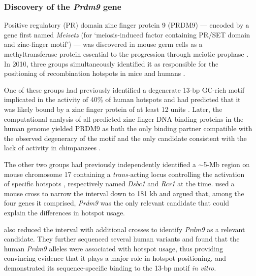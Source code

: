 \subsubsection{Discovery of the \textit{Prdm9} gene}

Positive regulatory (PR) domain zinc finger protein 9 (PRDM9) — encoded by a gene first named \textit{Meisetz} (for ‘meiosis-induced factor containing PR/SET domain and zinc-finger motif’) — was discovered in mouse germ cells as a methyltransferase protein essential to the progression through meiotic prophase \citep{hayashi2005histone,hayashi2006meisetz}.
In 2010, three groups simultaneously identified it as responsible for the positioning of recombination hotspots in mice and humans \citep[reviewed in \citealp{cheung2010genetic} and \citealp{hochwagen2010meiosis}]{baudat2010prdm9,myers2010drive,parvanov2010prdm9}.

One of these groups had previously identified a degenerate 13-bp GC-rich motif \citep{myers2005finescale} implicated in the activity of 40\% of human hotspots \citep{myers2008common,webb2008sperm} and had predicted that it was likely bound by a zinc finger protein of at least 12 units \citep{myers2008common}.
Later, the computational analysis of all predicted zinc-finger DNA-binding proteins in the human genome yielded PRDM9 as both the only binding partner compatible with the observed degeneracy of the motif and the only candidate consistent with the lack of activity in chimpanzees \citep{myers2010drive}.

The other two groups had previously independently identified a $\sim$5-Mb region on mouse chromosome 17 containing a \textit{trans-}acting locus controlling the activation of specific hotspots \citep{grey2009genomewide,parvanov2009transregulation}, respectively named \textit{Dsbc1} and \textit{Rcr1} at the time.
\citet{parvanov2010prdm9} used a mouse cross to narrow the interval down to 181 kb and argued that, among the four genes it comprised, \textit{Prdm9} was the only relevant candidate that could explain the differences in hotspot usage.

\citet{baudat2010prdm9} also reduced the interval with additional crosses to identify \textit{Prdm9} as a relevant candidate. 
They further sequenced several human variants and found that the human \textit{Prdm9} alleles were associated with hotspot usage, thus providing convincing evidence that it plays a major role in hotspot positioning, and demonstrated its sequence-specific binding to the 13-bp motif \textit{in vitro}.

